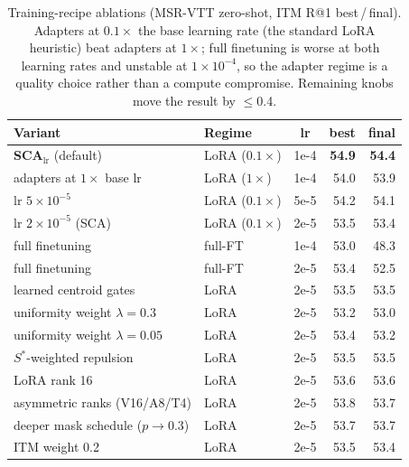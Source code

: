\begin{table}[t]
\centering
\caption{Training-recipe ablations (MSR-VTT zero-shot, ITM R@1 best\,/\,final).
Adapters at $0.1\times$ the base learning rate (the standard LoRA heuristic) beat
adapters at $1\times$; full finetuning is worse at both learning rates and unstable at
$1\!\times\!10^{-4}$, so the adapter regime is a quality choice rather than a compute
compromise. Remaining knobs move the result by $\le$0.4.}
\label{tab:ablate}
\small
\begin{tabular}{llcrr}
\toprule
Variant & Regime & lr & best & final \\
\midrule
\textbf{SCA}$_{\text{lr}}$ (default) & LoRA ($0.1\times$) & 1e-4 & \textbf{54.9} & \textbf{54.4} \\
\quad adapters at $1\times$ base lr & LoRA ($1\times$) & 1e-4 & 54.0 & 53.9 \\
\quad lr $5\!\times\!10^{-5}$ & LoRA ($0.1\times$) & 5e-5 & 54.2 & 54.1 \\
\quad lr $2\!\times\!10^{-5}$ (SCA) & LoRA ($0.1\times$) & 2e-5 & 53.5 & 53.4 \\
\midrule
full finetuning & full-FT & 1e-4 & 53.0 & 48.3 \\
full finetuning & full-FT & 2e-5 & 53.4 & 52.5 \\
\midrule
learned centroid gates & LoRA & 2e-5 & 53.5 & 53.5 \\
uniformity weight $\lambda\!=\!0.3$ & LoRA & 2e-5 & 53.2 & 53.0 \\
uniformity weight $\lambda\!=\!0.05$ & LoRA & 2e-5 & 53.4 & 53.2 \\
$S^{*}$-weighted repulsion & LoRA & 2e-5 & 53.5 & 53.5 \\
LoRA rank 16 & LoRA & 2e-5 & 53.6 & 53.6 \\
asymmetric ranks (V16/A8/T4) & LoRA & 2e-5 & 53.8 & 53.7 \\
deeper mask schedule ($p\!\to\!0.3$) & LoRA & 2e-5 & 53.7 & 53.7 \\
ITM weight 0.2 & LoRA & 2e-5 & 53.5 & 53.4 \\
\bottomrule
\end{tabular}
\end{table}

